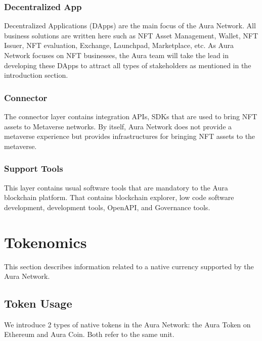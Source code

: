 \documentclass[12pt, titlepage]{article}
\begin{document}
\subsubsection*{Decentralized App}
Decentralized Applications (DApps) are the main focus of the Aura Network. All business solutions are written here such as NFT Asset Management, Wallet, NFT Issuer, NFT evaluation, Exchange, Launchpad, Marketplace, etc. As Aura Network focuses on NFT businesses, the Aura team will take the lead in developing these DApps to attract all types of stakeholders as mentioned in the introduction section.

\subsubsection*{Connector}
The connector layer contains integration APIs, SDKs that are used to bring NFT assets to Metaverse networks. By itself, Aura Network does not provide a metaverse experience but provides infrastructures for bringing NFT assets to the metaverse.

\subsubsection*{Support Tools}
This layer contains usual software tools that are mandatory to the Aura blockchain platform. That contains blockchain explorer, low code software development, development tools, OpenAPI, and Governance tools.

\section{Tokenomics}

This section describes information related to a native currency supported by the Aura Network.

\subsection{Token Usage}
We introduce 2 types of native tokens in the Aura Network: the Aura Token on Ethereum and Aura Coin. Both refer to the same unit.
\end{document}

